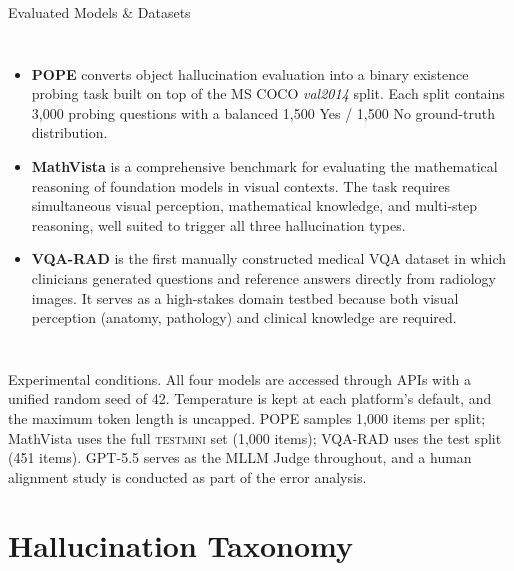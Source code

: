 \documentclass[9pt,aspectratio=169]{beamer}
\begin{document}
\begin{frame}{Evaluated Models \& Datasets}
\begin{columns}[T,onlytextwidth]
      \footnotesize
      \begin{itemize}\setlength{\itemsep}{0.45em}\setlength{\parskip}{0pt}
        \item \textbf{POPE} converts object hallucination evaluation
              into a binary existence probing task
              built on top of the MS COCO \textit{val2014} split.
              Each split contains 3{,}000 probing questions
              with a balanced 1{,}500 Yes / 1{,}500 No
              ground-truth distribution.
        \item \textbf{MathVista} is a comprehensive benchmark
              for evaluating the mathematical reasoning of
              foundation models in visual contexts.
              The task requires simultaneous visual perception,
              mathematical knowledge, and multi-step reasoning,
              well suited to trigger all three hallucination types.
        \item \textbf{VQA-RAD} is the first manually constructed
              medical VQA dataset in which clinicians generated
              questions and reference answers directly from
              radiology images.
              It serves as a high-stakes domain testbed because
              both visual perception (anatomy, pathology)
              and clinical knowledge are required.
      \end{itemize}
  \end{columns}

  \vspace{0.6em}
  \begin{block}{Experimental conditions.}
    \footnotesize
    All four models are accessed through APIs
    with a unified random seed of 42.
    Temperature is kept at each platform's default,
    and the maximum token length is uncapped.
    POPE samples 1{,}000 items per split;
    MathVista uses the full \textsc{testmini} set (1{,}000 items);
    VQA-RAD uses the test split (451 items).
    GPT-5.5 serves as the MLLM Judge throughout,
    and a human alignment study is conducted
    as part of the error analysis.
  \end{block}
\end{frame}

\section{Hallucination Taxonomy}
\end{document}

